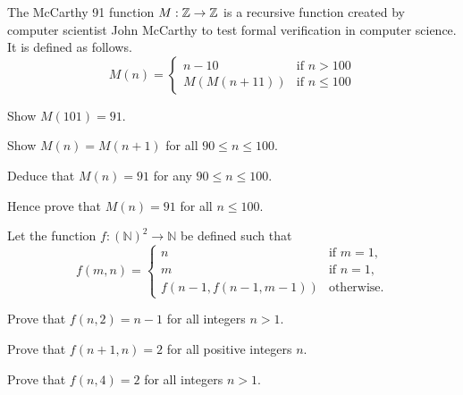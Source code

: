 \begin{problem}
    The McCarthy 91 function $M: \mathbb{Z} \to \mathbb{Z}$ is a recursive function created by computer scientist John McCarthy to test formal verification in computer science. It is defined as follows.
    \[
        M(n) = \begin{cases}
            n - 10 & \text{if } n > 100\\
            M(M(n+11)) & \text{if } n \leq 100
        \end{cases}
    \]
    \begin{partquestions}{\roman*}
        \item Show $M(101) = 91$.
        \item Show $M(n) = M(n+1)$ for all $90 \leq n \leq 100$.
        \item Deduce that $M(n) = 91$ for any $90 \leq n \leq 100$.
        \item Hence prove that $M(n) = 91$ for all $n \leq 100$.
    \end{partquestions}
\end{problem}

\begin{problem}
    Let the function $f: \left(\mathbb{N}\right)^2\to\mathbb{N}$ be defined such that
    \[
        f(m, n) =
        \begin{cases}
            n & \text{if } m = 1, \\
            m & \text{if } n = 1, \\
            f\left(n-1,f(n-1,m-1)\right) & \text{otherwise.}
        \end{cases}
    \]
    \begin{partquestions}{\roman*}
        \item Prove that $f(n,2) = n - 1$ for all integers $n > 1$.
        \item Prove that $f(n+1, n) = 2$ for all positive integers $n$.
        \item Prove that $f(n, 4) = 2$ for all integers $n > 1$.
    \end{partquestions}
\end{problem}
